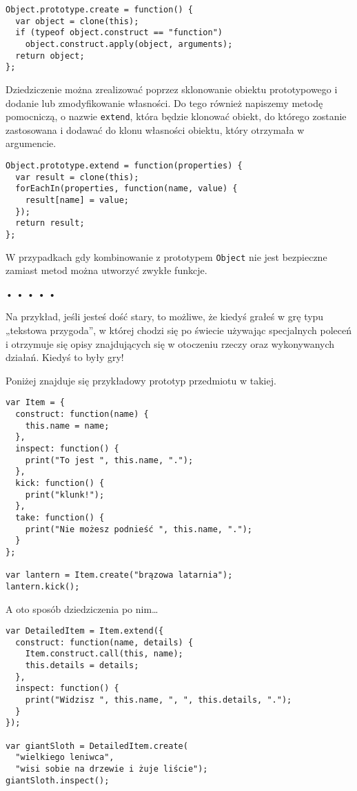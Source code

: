   
\begin{verbatim} 
Object.prototype.create = function() {
  var object = clone(this);
  if (typeof object.construct == "function")
    object.construct.apply(object, arguments);
  return object;
};
 \end{verbatim}
  
Dziedziczenie można zrealizować poprzez sklonowanie obiektu prototypowego i dodanie lub zmodyfikowanie własności. Do tego również napiszemy metodę pomocniczą, o nazwie \texttt{extend}, która będzie klonować obiekt, do którego zostanie zastosowana i dodawać do klonu własności obiektu, który otrzymała w argumencie.

  
\begin{verbatim} 
Object.prototype.extend = function(properties) {
  var result = clone(this);
  forEachIn(properties, function(name, value) {
    result[name] = value;
  });
  return result;
};
 \end{verbatim}
  
W przypadkach gdy kombinowanie z prototypem \texttt{Object} nie jest bezpieczne zamiast metod można utworzyć zwykłe funkcje.



\begin{center}
• • • • •
\end{center}

  
Na przykład, jeśli jesteś dość stary, to możliwe, że kiedyś grałeś w grę typu „tekstowa przygoda”, w której chodzi się po świecie używając specjalnych poleceń i otrzymuje się opisy znajdujących się w otoczeniu rzeczy oraz wykonywanych działań. Kiedyś to były gry!

  
Poniżej znajduje się przykładowy prototyp przedmiotu w takiej.

  
\begin{verbatim} 
var Item = {
  construct: function(name) {
    this.name = name;
  },
  inspect: function() {
    print("To jest ", this.name, ".");
  },
  kick: function() {
    print("klunk!");
  },
  take: function() {
    print("Nie możesz podnieść ", this.name, ".");
  }
};

var lantern = Item.create("brązowa latarnia");
lantern.kick();
 \end{verbatim}
  
A oto sposób dziedziczenia po nim…

  
\begin{verbatim} 
var DetailedItem = Item.extend({
  construct: function(name, details) {
    Item.construct.call(this, name);
    this.details = details;
  },
  inspect: function() {
    print("Widzisz ", this.name, ", ", this.details, ".");
  }
});

var giantSloth = DetailedItem.create(
  "wielkiego leniwca",
  "wisi sobie na drzewie i żuje liście");
giantSloth.inspect();
 \end{verbatim}
  
